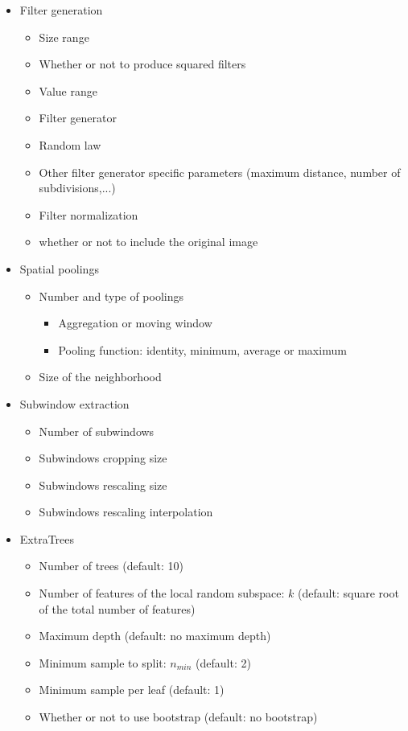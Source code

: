 \documentclass[a4paper]{report}
\begin{document}
	\begin{itemize}
	
		\item Filter generation
		\begin{itemize}
			\item Size range
			\item Whether or not to produce squared filters
			\item Value range
			\item Filter generator
			\item Random law
			\item Other filter generator specific parameters (maximum distance, number of subdivisions,...)
			\item Filter normalization
			\item whether or not to include the original image
		\end{itemize}
		
		\item Spatial poolings
		\begin{itemize}
			\item Number and type of poolings
			\begin{itemize}
				\item Aggregation or moving window
				\item Pooling function: identity, minimum, average or maximum
			\end{itemize}
			\item Size of the neighborhood
		\end{itemize}
		
		\item Subwindow extraction
		\begin{itemize}
			\item Number of subwindows
			\item Subwindows cropping size
			\item Subwindows rescaling size
			\item Subwindows rescaling interpolation
		\end{itemize}
		
		\item ExtraTrees
		\begin{itemize}
			\item Number of trees (default: 10)
			\item Number of features of the local random subspace: $k$ (default: square root of the total number of features)
			\item Maximum depth (default: no maximum depth)
			\item Minimum sample to split: $n_{min}$ (default: 2)
			\item Minimum sample per leaf (default: 1)
			\item Whether or not to use bootstrap (default: no bootstrap)
		\end{itemize}
	\end{itemize}
	
\end{document}
